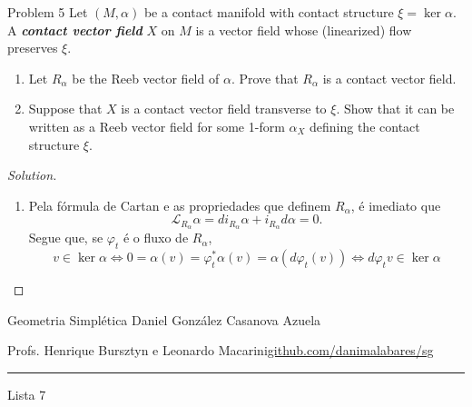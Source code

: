 \begin{thing4}{Problem 5}\leavevmode
	Let $(M,\alpha)$ be a contact manifold with contact structure $\xi=\ker \alpha$. A \textit{\textbf{contact vector field}} $X$ on $M$ is a vector field whose (linearized) flow preserves $\xi$.
	\begin{enumerate}[label=(\alph*)]
	\item Let $R_\alpha$ be the Reeb vector field of $\alpha$. Prove that $R_\alpha$ is a contact vector field.
	\item Suppose that $X$ is a contact vector field transverse to $\xi$. Show that it can be written as a Reeb vector field for some 1-form $\alpha_X$ defining the contact structure $\xi$.
	\end{enumerate}
\end{thing4}

\begin{proof}[Solution]\leavevmode
\begin{enumerate}[label=(\alph*)]
\item Pela  fórmula de Cartan e as propriedades que definem $R_\alpha$, é imediato que
	\[\mathcal{L}_{R_\alpha}\alpha=d i_{R_\alpha}\alpha+i_{R_\alpha}d\alpha=0.\]
	Segue que, se $\varphi_t$ é o fluxo de $R_\alpha$,
	\[v \in \ker \alpha \iff 0=\alpha(v)=\varphi^*_t\alpha(v)=\alpha(d\varphi_t(v)) \iff d\varphi_tv \in \ker \alpha\]
	
	
\end{enumerate}
\end{proof}

\begin{minipage}{\textwidth}
	\begin{minipage}{1\textwidth}
		Geometria Simpl\'etica \hfill Daniel González Casanova Azuela
		
		{\small Profs. Henrique Bursztyn e Leonardo Macarini\hfill\href{https://github.com/danimalabares/sg}{github.com/danimalabares/sg}}
	\end{minipage}
\end{minipage}\vspace{.2cm}\hrule

\vspace{10pt}
{\huge Lista 7}

\tableofcontents
\vspace{1em}

